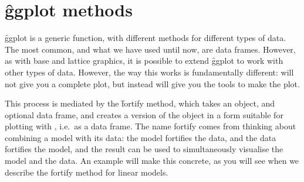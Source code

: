 {%
% 
% 
% 
% 
% 

\section{\f{ggplot} methods}
\label{sec:methods}

\f{ggplot} is a generic function, with different methods for different types of data. The most common, and what we have used until now, are data frames. However, as with base and lattice graphics, it is possible to extend \f{ggplot} to work with other types of data. However, the way this works is fundamentally different: \ggplot will not give you a complete plot, but instead will give you the tools to make the plot.

This process is mediated by the \f{fortify} method, which takes an object, and optional data frame, and creates a version of the object in a form suitable for plotting with \ggplot, i.e.\ as a data frame. The name fortify comes from thinking about combining a model with its data: the model fortifies the data, and the data fortifies the model, and the result can be used to simultaneously visualise the model and the data. An example will make this concrete, as you will see when we describe the fortify method for linear models.

}
